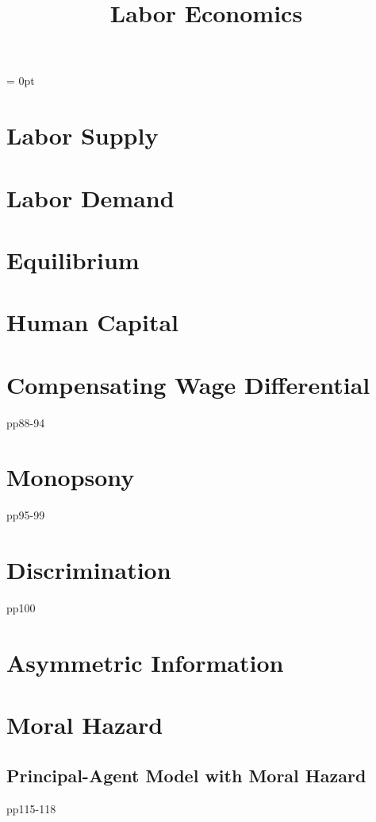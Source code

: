 \documentclass[dvipdfmx, 12pt]{article}
\begin{document}
\parindent = 0pt

\title{Labor Economics}
\author{}
\date{}
\maketitle

\section{Labor Supply}

\section{Labor Demand}

\section{Equilibrium}

\section{Human Capital}

\section{Compensating Wage Differential}
pp88-94

\section{Monopsony}
pp95-99

\section{Discrimination}
pp100

\section{Asymmetric Information}

\section{Moral Hazard}

\subsection{Principal-Agent Model with Moral Hazard}
pp115-118
\end{document}
